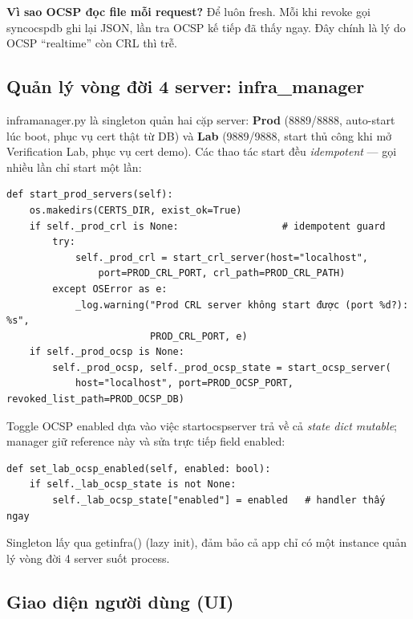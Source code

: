 \documentclass[12pt,a4paper]{article}
\newcommand{\code}[1]{{\ttfamily\small\def\_{\textunderscore\discretionary{}{}{}}#1}}
\begin{document}
\begin{notebox}
\textbf{Vì sao OCSP đọc file mỗi request?} Để luôn fresh. Mỗi khi revoke gọi
\code{sync\_ocsp\_db} ghi lại JSON, lần tra OCSP kế tiếp đã thấy ngay. Đây chính
là lý do OCSP ``realtime'' còn CRL thì trễ.
\end{notebox}

\subsection{Quản lý vòng đời 4 server: infra\_manager}

\code{infra\_manager.py} là singleton quản hai cặp server: \textbf{Prod}
(8889/8888, auto-start lúc boot, phục vụ cert thật từ DB) và \textbf{Lab}
(9889/9888, start thủ công khi mở Verification Lab, phục vụ cert demo). Các thao
tác start đều \emph{idempotent} --- gọi nhiều lần chỉ start một lần:

\begin{Verbatim}
def start_prod_servers(self):
    os.makedirs(CERTS_DIR, exist_ok=True)
    if self._prod_crl is None:                  # idempotent guard
        try:
            self._prod_crl = start_crl_server(host="localhost",
                port=PROD_CRL_PORT, crl_path=PROD_CRL_PATH)
        except OSError as e:
            _log.warning("Prod CRL server không start được (port %d?): %s",
                         PROD_CRL_PORT, e)
    if self._prod_ocsp is None:
        self._prod_ocsp, self._prod_ocsp_state = start_ocsp_server(
            host="localhost", port=PROD_OCSP_PORT, revoked_list_path=PROD_OCSP_DB)
\end{Verbatim}

Toggle OCSP enabled dựa vào việc \code{start\_ocsp\_server} trả về cả
\emph{state dict mutable}; manager giữ reference này và sửa trực tiếp field
\code{enabled}:

\begin{Verbatim}
def set_lab_ocsp_enabled(self, enabled: bool):
    if self._lab_ocsp_state is not None:
        self._lab_ocsp_state["enabled"] = enabled   # handler thấy ngay
\end{Verbatim}

Singleton lấy qua \code{get\_infra()} (lazy init), đảm bảo cả app chỉ có một
instance quản lý vòng đời 4 server suốt process.

\subsection{Giao diện người dùng (UI)}
\end{document}
